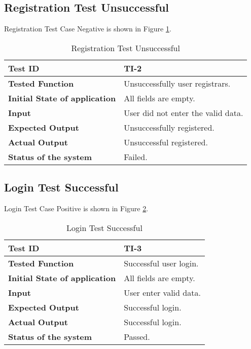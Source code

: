 \subsection{Registration Test Unsuccessful}
Registration Test Case Negative is shown in Figure \ref{tt2}.
\begin{table}[!h]
    \centering
    \begin{tabular}{|p{5cm}|p{8cm}|}
        \hline
        \textbf{Test ID} & \textbf{TI-2}\\
        \hline
        \textbf{Tested Function} & Unsuccessfully user registrars. \\
        \hline
        \textbf{Initial State of application} & All fields are empty.\\
        \hline
        \textbf{Input} & User did not enter the valid data.\\
        \hline
        \textbf{Expected Output} & Unsuccessfully registered.\\
        \hline
        \textbf{Actual Output} & Unsuccessful registered.\\
         \hline
         \textbf{Status of the system} & Failed.\\
         \hline
    \end{tabular}
    \caption{Registration Test Unsuccessful}
    \label{tt2}
\end{table}
\newpage
\subsection{Login Test Successful}
Login Test Case Positive is shown in Figure \ref{tt3}.
\begin{table}[!h]
    \centering
    \begin{tabular}{|p{5cm}|p{8cm}|}
        \hline
        \textbf{Test ID} & \textbf{TI-3}\\
        \hline
        \textbf{Tested Function} &  Successful user login. \\
        \hline
        \textbf{Initial State of application} & All fields are empty.\\
        \hline
        \textbf{Input} & User enter valid data.\\
        \hline
        \textbf{Expected Output} &  Successful login.\\
        \hline
        \textbf{Actual Output} & Successful login.\\
         \hline
         \textbf{Status of the system} & Passed.\\
         \hline
    \end{tabular}
    \caption{Login Test Successful}
    \label{tt3}
\end{table}
